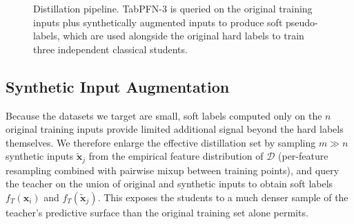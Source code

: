 \documentclass[10pt]{article}
\begin{document}
\begin{figure}[t]
\centering
{}
\caption{Distillation pipeline. TabPFN-3 is queried on the original
training inputs plus synthetically augmented inputs to produce soft
pseudo-labels, which are used alongside the original hard labels to
train three independent classical students.}
\label{fig:pipeline}
\end{figure}

\subsection{Synthetic Input Augmentation}
Because the datasets we target are small, soft labels computed only
on the $n$ original training inputs provide limited additional signal
beyond the hard labels themselves. We therefore enlarge the effective
distillation set by sampling $m \gg n$ synthetic inputs
$\tilde{\mathbf{x}}_j$ from the empirical feature distribution of
$\mathcal{D}$ (per-feature resampling combined with pairwise mixup
between training points), and query the teacher on the union of
original and synthetic inputs to obtain soft labels
$f_T(\mathbf{x}_i)$ and $f_T(\tilde{\mathbf{x}}_j)$. This exposes the
students to a much denser sample of the teacher's predictive surface
than the original training set alone permits.
\end{document}
